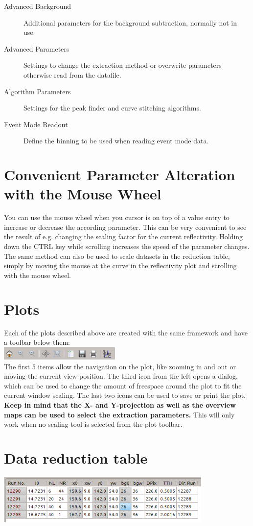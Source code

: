 \begin{description}
   \item[Advanced Background] Additional parameters for the background subtraction, normally not in use.
   \item[Advanced Parameters] Settings to change the extraction method or overwrite parameters otherwise read from the datafile.
   \item[Algorithm Parameters] Settings for the peak finder and curve stitching algorithms.
   \item[Event Mode Readout] Define the binning to be used when reading event mode data.
  \end{description}

\section{Convenient Parameter Alteration with the Mouse Wheel}
  You can use the mouse wheel when you cursor is on top of a value entry to increase or decrease the according parameter. 
  This can be very convenient to see the result of e.g. changing the scaling factor for the current reflectivity. Holding down the CTRL key while scrolling increases the speed of the parameter changes.
  The same method can also be used to scale datasets in the reduction table, simply by moving the mouse at the curve in the reflectivity plot and scrolling with the mouse wheel.
  
\section{Plots}
  Each of the plots described above are created with the same framework and have a toolbar below them:\\
  \includegraphics[width=6cm]{screenshots/plottoolbar.png}\\
  The first 5 items allow the navigation on the plot, like zooming in and out or moving the current view position.
  The third icon from the left opens a dialog, which can be used to change the amount of freespace around the plot to fit the current window scaling.
  The last two icons can be used to save or print the plot.
  \textbf{Keep in mind that the X- and Y-projection as well as the overview maps can be used to select the extraction parameters.}
  This will only work when no scaling tool is selected from the plot toolbar.

\section{Data reduction table}
  \includegraphics[width=0.8\textwidth]{screenshots/reductiontable.png}

